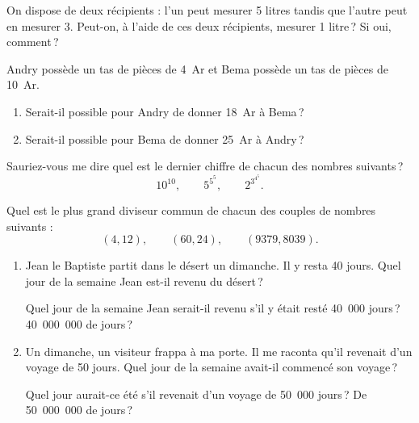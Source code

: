 \begin{exo}
	On dispose de deux r\'ecipients : l'un peut mesurer 5 litres tandis que l'autre peut en mesurer 3.
	Peut-on, \`a l'aide de ces deux r\'ecipients, mesurer 1 litre\,? Si oui, comment\,?
\end{exo}
%
\begin{exo}
	Andry poss\`ede un tas de pi\`eces de 4~Ar et Bema poss\`ede un tas de pi\`eces de 10~Ar.
	\begin{enumerate}
		\item Serait-il possible pour Andry de donner 18~Ar \`a Bema\,?
		\item Serait-il possible pour Bema de donner 25~Ar \`a Andry\,?
	\end{enumerate}
\end{exo}
%
\begin{exo}
	Sauriez-vous me dire quel est le dernier chiffre de chacun des nombres suivants\,?
		\[ 
			10^{10}			,\qquad
			5^{5^{5}}			,\qquad
			2^{3^{4^{5}}} 	.
		\]
\end{exo}
%
\begin{exo}
	Quel est le plus grand diviseur commun de chacun des couples de nombres suivants :
	\[
		(4,12)				,\qquad
		(60,24)			,\qquad
		(9379,8039)		.
	\]
\end{exo}
%
\begin{exo}
	\begin{enumerate}
		\item 
				Jean le Baptiste partit dans le d\'esert un dimanche.
			Il y resta 40 jours.
			Quel jour de la semaine Jean est-il revenu du d\'esert\,?
			
				Quel jour de la semaine Jean serait-il revenu s'il y \'etait rest\'e 40~000 jours\,? 40~000~000 de jours\,?
		\item 
			Un dimanche, un visiteur frappa \`a ma porte.
				Il me raconta qu'il revenait d'un voyage de 50 jours.
				Quel jour de la semaine avait-il commenc\'e son voyage\,?
			
				Quel jour aurait-ce \'et\'e s'il revenait d'un voyage de 50~000 jours\,? De 50~000~000 de jours\,?
	\end{enumerate}
\end{exo}
%
